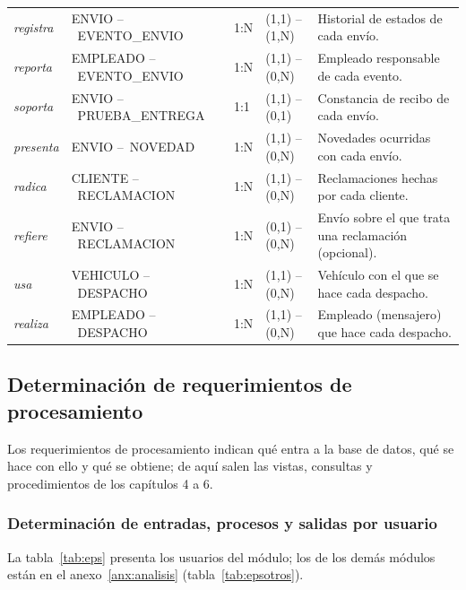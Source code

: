 {\begin{longtable}{L{1.5cm} L{4.9cm} L{0.8cm} L{2.4cm} L{3.9cm}}
\textit{registra} & ENVIO --\allowbreak\ EVENTO\_ENVIO & 1:N & (1,1) -- (1,N) & Historial de estados de cada envío. \\
\textit{reporta} & EMPLEADO --\allowbreak\ EVENTO\_ENVIO & 1:N & (1,1) -- (0,N) & Empleado responsable de cada evento. \\
\textit{soporta} & ENVIO --\allowbreak\ PRUEBA\_ENTREGA & 1:1 & (1,1) -- (0,1) & Constancia de recibo de cada envío. \\
\textit{presenta} & ENVIO --\allowbreak\ NOVEDAD & 1:N & (1,1) -- (0,N) & Novedades ocurridas con cada envío. \\
\textit{radica} & CLIENTE --\allowbreak\ RECLAMACION & 1:N & (1,1) -- (0,N) & Reclamaciones hechas por cada cliente. \\
\textit{refiere} & ENVIO --\allowbreak\ RECLAMACION & 1:N & (0,1) -- (0,N) & Envío sobre el que trata una reclamación (opcional). \\
\textit{usa} & VEHICULO --\allowbreak\ DESPACHO & 1:N & (1,1) -- (0,N) & Vehículo con el que se hace cada despacho. \\
\textit{realiza} & EMPLEADO --\allowbreak\ DESPACHO & 1:N & (1,1) -- (0,N) & Empleado (mensajero) que hace cada despacho. \\
\end{longtable}
\par}

\subsection{Determinación de requerimientos de procesamiento}

Los requerimientos de procesamiento indican qué entra a la base de
datos, qué se hace con ello y qué se obtiene; de aquí salen las vistas,
consultas y procedimientos de los capítulos 4 a 6.

\subsubsection{Determinación de entradas, procesos y salidas por usuario}
\label{sec:eps}

La tabla~\ref{tab:eps} presenta los usuarios del módulo; los de los
demás módulos están en el anexo~\ref{anx:analisis}
(tabla~\ref{tab:epsotros}).

